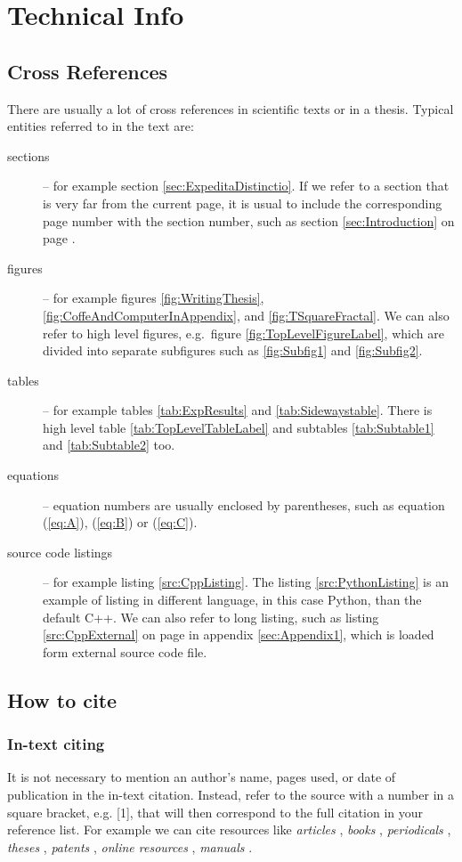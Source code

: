 \documentclass[english,master,dept460,male,cpp,cpdeclaration]{diploma}
\begin{document}
\section{Technical Info}
\subsection{Cross References}
\label{sec:CrossReferences}
There are usually a lot of cross references in scientific texts or in a thesis. Typical entities referred to in the text are:
\begin{description}
	\item [sections] -- for example section \ref{sec:ExpeditaDistinctio}. If we refer to a section that is very far from the current page, it is usual to include the corresponding page number with the section number, such as section \ref{sec:Introduction} on page \pageref{sec:Introduction}.
	\item [figures] -- for example figures \ref{fig:WritingThesis}, \ref{fig:CoffeAndComputerInAppendix}, and \ref{fig:TSquareFractal}. We can also refer to high level figures, e.g.\ figure \ref{fig:TopLevelFigureLabel}, which are divided into separate subfigures such as \ref{fig:Subfig1} and \ref{fig:Subfig2}.
	\item [tables] -- for example tables \ref{tab:ExpResults} and \ref{tab:Sidewaystable}. There is high level table \ref{tab:TopLevelTableLabel} and subtables \ref{tab:Subtable1} and \ref{tab:Subtable2} too.
	\item [equations] -- equation numbers are usually enclosed by parentheses, such as equation (\ref{eq:A}), (\ref{eq:B}) or (\ref{eq:C}).
	\item [source code listings] -- for example listing \ref{src:CppListing}. The listing \ref{src:PythonListing} is an example of listing in different language, in this case Python, than the default C++. We can also refer to long listing, such as listing \ref{src:CppExternal} on page \pageref{src:CppExternal} in appendix \ref{sec:Appendix1}, which is loaded form external source code file.
\end{description}

\subsection{How to cite}
\label{sec:HowToCite}
\subsubsection{In-text citing}
It is not necessary to mention an author's name, pages used, or date of publication in the in-text citation. Instead, refer to the source with a number in a square bracket, e.g. [1], that will then correspond to the full citation in your reference list. For example we can cite resources like \emph{articles} \cite{herrmann, bertram, moore, yoon, sigfridsson, baez/article}, \emph{books} \cite{wilde, nietzsche:ksa1, averroes/bland, hammond, cotton, knuth:ct:a, gerhardt, gonzalez, companion}, \emph{periodicals} \cite{jcg}, \emph{theses} \cite{geer}, \emph{patents} \cite{kowalik, almendro, sorace, laufenberg}, \emph{online resources} \cite{ctan, wassenberg, itzhaki, markey, baez/online}, \emph{manuals} \cite{cms}.
\end{document}
